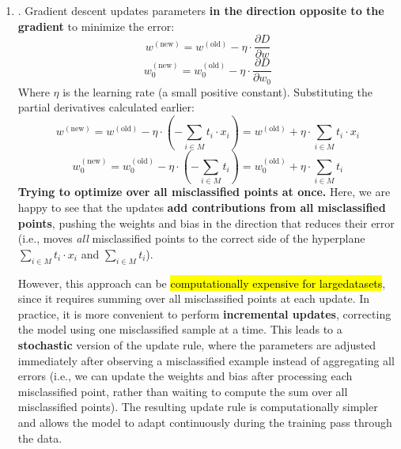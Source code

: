 \begin{enumerate}
    \item {}. Gradient descent updates parameters \textbf{in the direction opposite to the gradient} to minimize the error:
    \begin{equation*}
        w^{\left(\text{new}\right)} = w^{\left(\text{old}\right)} - \eta \cdot \dfrac{\partial D}{\partial w}
    \end{equation*}
    \begin{equation*}
        w_0^{\left(\text{new}\right)} = w_0^{\left(\text{old}\right)} - \eta \cdot \dfrac{\partial D}{\partial w_0}
    \end{equation*}
    Where $\eta$ is the learning rate (a small positive constant). Substituting the partial derivatives calculated earlier:
    \begin{equation*}
        w^{\left(\text{new}\right)} = w^{\left(\text{old}\right)} - \eta \cdot \left(- \sum_{i \in M} t_i \cdot x_i\right) = w^{\left(\text{old}\right)} + \eta \cdot \sum_{i \in M} t_i \cdot x_i
    \end{equation*}
    \begin{equation*}
        w_0^{\left(\text{new}\right)} = w_0^{\left(\text{old}\right)} - \eta \cdot \left(- \sum_{i \in M} t_i\right) = w_0^{\left(\text{old}\right)} + \eta \cdot \sum_{i \in M} t_i
    \end{equation*}
    \textcolor{Red2}{ \textbf{Trying to optimize over all misclassified points at once.}}\label{warn:perceptron-batch} Here, we are happy to see that the updates \textbf{add contributions from all misclassified points}, pushing the weights and bias in the direction that reduces their error (i.e., moves \emph{all} misclassified points to the correct side of the hyperplane $\sum_{i \in M} t_i \cdot x_i$ and $\sum_{i \in M} t_i$).
    
    However, this approach can be \hl{computationally expensive for large\break datasets}, since it requires summing over all misclassified points at each update. In practice, it is more convenient to perform \textbf{incremental updates}, correcting the model using one misclassified sample at a time. This leads to a \textbf{stochastic} version of the update rule, where the parameters are adjusted immediately after observing a misclassified example instead of aggregating all errors (i.e., we can update the weights and bias after processing each misclassified point, rather than waiting to compute the sum over all misclassified points). The resulting update rule is computationally simpler and allows the model to adapt continuously during the training pass through the data.
    


\end{enumerate}
